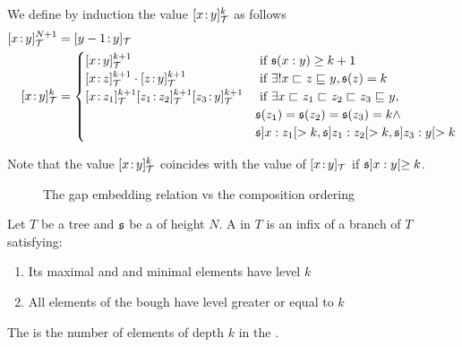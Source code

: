 We define by induction the value $\tlbl{\t}{x}{y}^k$ as follows
\begin{align*}
    \tlbl{\t}{x}{y}^{N+1} &= \tlbl{\t}{y-1}{y} \\
    \tlbl{\t}{x}{y}^{k} &=
    \begin{cases}
        \tlbl{\t}{x}{y}^{k+1} & \text{ if } \spt(x:y) \geq k + 1 \\
        \tlbl{\t}{x}{z}^{k+1} \cdot \tlbl{\t}{z}{y}^{k+1} 
                              & \text{ if } \existsu x \treelt z \treeleq y, \spt(z) = k
        \\
        \tlbl{\t}{x}{z_1}^{k+1} 
        \tlbl{\t}{z_1}{z_2}^{k+1} 
        \tlbl{\t}{z_3}{y}^{k+1} 
                              & \text{ if } \exists x \treelt z_1 \treelt z_2 \treelt z_3 \treeleq y, \\
                              &
        \spt(z_1) = \spt(z_2) = \spt(z_3) = k
        \wedge  \\
                              &
        \spt]x : z_1[ > k, \spt]z_1:z_2[ > k, \spt]z_3:y[ > k
    \end{cases}
\end{align*}

Note that the value $\tlbl{\t}{x}{y}^k$ coincides with the value of
$\tlbl{\t}{x}{y}$ if $\mathfrak{s}]x:y[ \geq k$.


\begin{figure}
    \centering
    \caption{The gap embedding relation vs the composition ordering}
    \label{gap-embedding-composition-diff:fig}
\end{figure}


\begin{definition}
    \label{ramseyan-branch:def}
    Let $T$ be a tree and $\mathfrak{s}$ be a  of height $N$.
    A  in $T$ is an infix of a branch of $T$
    satisfying:
    \begin{enumerate}
        \item Its maximal and and minimal elements have level $k$
        \item All elements of the bough have level greater or equal to $k$
    \end{enumerate}
    The  is the number of elements of depth $k$
    in the .
\end{definition}

